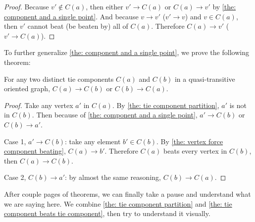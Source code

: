 \begin{proof}
  Because \(v' \notin C(a)\),
  then either \(v' \to C(a)\) or \(C(a) \to v'\)
  by \cref{the: component and a single point}.
  And because \(v \to v'\) (\(v' \to v\)) and \(v \in C(a)\),
  then \(v'\) cannot beat (be beaten by) all of \(C(a)\).
  Therefore \(C(a) \to v'\) (\(v' \to C(a)\)).
\end{proof}

To further generalize \cref{the: component and a single point},
we prove the following theorem:

\begin{theorem}\label{the: tie component beats tie component}
  For any two distinct tie components \(C(a)\) and \(C(b)\)
  in a quasi-transitive oriented graph,
  \(C(a) \to C(b)\) or \(C(b) \to C(a)\).
\end{theorem}

\begin{proof}
  Take any vertex \(a'\) in \(C(a)\).
  By \cref{the: tie component partition}, \(a'\) is not in \(C(b)\).
  Then because of \cref{the: component and a single point},
  \(a' \to C(b)\) or \(C(b) \to a'\).

  Case 1, \(a' \to C(b)\): take any element \(b' \in C(b)\).
  By \cref{the: vertex force component beating}, \(C(a) \to b'\).
  Therefore \(C(a)\) beats every vertex in \(C(b)\),
  then \(C(a) \to C(b)\).

  Case 2, \(C(b) \to a'\):
  by almost the same reasoning, \(C(b) \to C(a)\).
\end{proof}

After couple pages of theorems,
we can finally take a pause
and understand what we are saying here.
We combine \cref{the: tie component partition} and
\cref{the: tie component beats tie component},
then try to understand it visually.

